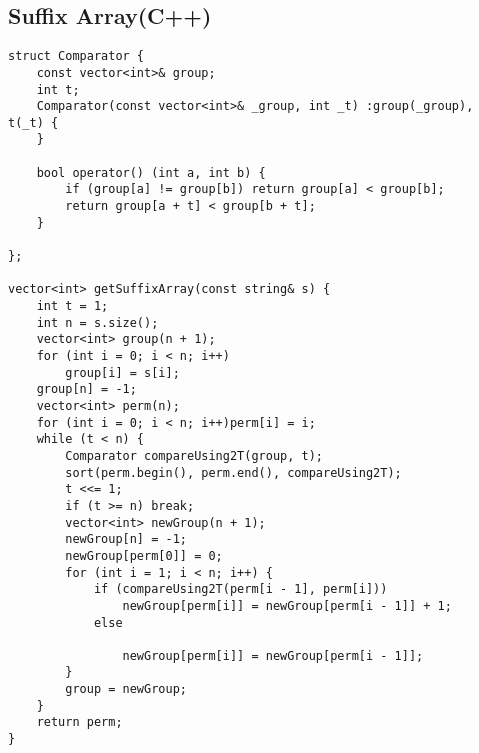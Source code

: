 \documentclass[landscape, 8pt, a4paper, oneside, twocolumn]{extarticle}
\begin{document}
\subsection{Suffix Array(C++)}
\begin{verbatim}
struct Comparator {
	const vector<int>& group;
	int t;
	Comparator(const vector<int>& _group, int _t) :group(_group), t(_t) {
	}

	bool operator() (int a, int b) {
		if (group[a] != group[b]) return group[a] < group[b];
		return group[a + t] < group[b + t];
	}

};

vector<int> getSuffixArray(const string& s) {
	int t = 1;
	int n = s.size();
	vector<int> group(n + 1);
	for (int i = 0; i < n; i++)
		group[i] = s[i];
	group[n] = -1;
	vector<int> perm(n);
	for (int i = 0; i < n; i++)perm[i] = i;
	while (t < n) {
		Comparator compareUsing2T(group, t);
		sort(perm.begin(), perm.end(), compareUsing2T);
		t <<= 1;
		if (t >= n) break;
		vector<int> newGroup(n + 1);
		newGroup[n] = -1;
		newGroup[perm[0]] = 0;
		for (int i = 1; i < n; i++) {
			if (compareUsing2T(perm[i - 1], perm[i]))
				newGroup[perm[i]] = newGroup[perm[i - 1]] + 1;
			else

				newGroup[perm[i]] = newGroup[perm[i - 1]];
		}
		group = newGroup;
	}
	return perm;
}
\end{verbatim}
\end{document}

